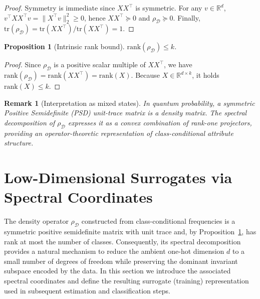 \documentclass[preprint,11pt]{elsarticle}
\newtheorem{Proposition}[Theorem]{Proposition}
\newtheorem{Remark}[Theorem]{Remark}
\newcommand{\R}{\mathbb{R}}
\begin{document}
\begin{proof}
Symmetry is immediate since $XX^\top$ is symmetric.
For any $v\in\R^d$, $v^\top XX^\top v = \|X^\top v\|_2^2\ge 0$, hence $XX^\top\succeq 0$ and $\rho_{\mathcal D}\succeq 0$.
Finally, $\mathrm{tr}(\rho_{\mathcal D})=\mathrm{tr}(XX^\top)/\mathrm{tr}(XX^\top)=1$.
\end{proof}

\begin{Proposition}[Intrinsic rank bound]
\label{prop:rank_bound_mdpi}
$\mathrm{rank}(\rho_{\mathcal D})\le k$.
\end{Proposition}

\begin{proof}
Since $\rho_{\mathcal D}$ is a positive scalar multiple of $XX^\top$, we have
$\mathrm{rank}(\rho_{\mathcal D})=\mathrm{rank}(XX^\top)=\mathrm{rank}(X)$.
Because $X\in\R^{d\times k}$, it holds $\mathrm{rank}(X)\le k$.
\end{proof}

\begin{Remark}[Interpretation as mixed states]
In quantum probability, a symmetric Positive Semidefinite (PSD) unit-trace matrix is a density matrix.
The spectral decomposition of $\rho_{\mathcal D}$ expresses it as a convex combination of rank-one projectors,
providing an operator-theoretic representation of class-conditional attribute structure.
\end{Remark}


\section{Low-Dimensional Surrogates via Spectral Coordinates}
\label{sec:surrogate}

The density operator $\rho_{\mathcal D}$ constructed from class-conditional frequencies is a symmetric positive semidefinite matrix with
unit trace and, by Proposition~\ref{prop:rank_bound_mdpi}, has rank at most the number of classes. Consequently, its spectral decomposition
provides a natural mechanism to reduce the ambient one-hot dimension $d$ to a small number of degrees of freedom while preserving the dominant
invariant subspace encoded by the data. In this section we introduce the associated spectral coordinates and define the resulting surrogate
(training) representation used in subsequent estimation and classification steps.
\end{document}
